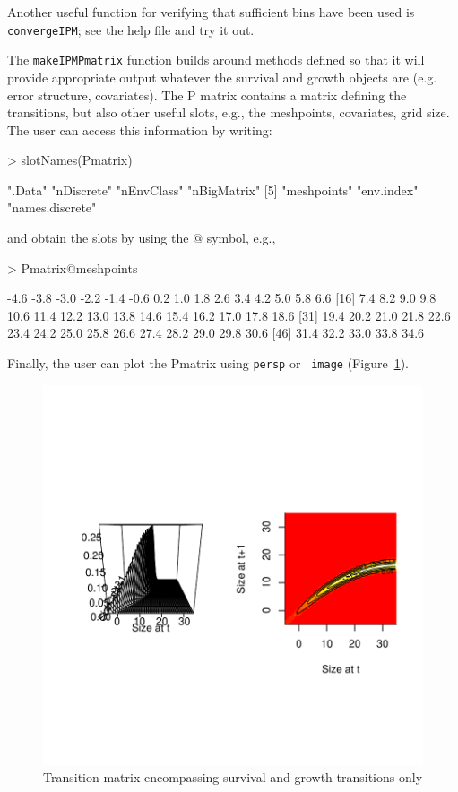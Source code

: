 \documentclass{article}
\begin{document}
Another useful function for verifying that sufficient bins have been used
is {\tt convergeIPM}; see the help file and try it out.

The {\tt makeIPMPmatrix} function builds around methods defined so that it
will provide appropriate output whatever the survival and growth objects are
(e.g. error structure, covariates). The P matrix contains a matrix defining the
transitions, but also other useful slots, e.g., the meshpoints, covariates,
grid size. The user can access this information by writing:
\begin{Schunk}
\begin{Sinput}
> slotNames(Pmatrix)
\end{Sinput}
\begin{Soutput}
[1] ".Data"          "nDiscrete"      "nEnvClass"      "nBigMatrix"    
[5] "meshpoints"     "env.index"      "names.discrete"
\end{Soutput}
\end{Schunk}
and obtain the slots by using the $@$ symbol, e.g., 
\begin{Schunk}
\begin{Sinput}
> Pmatrix@meshpoints
\end{Sinput}
\begin{Soutput}
 [1] -4.6 -3.8 -3.0 -2.2 -1.4 -0.6  0.2  1.0  1.8  2.6  3.4  4.2  5.0  5.8  6.6
[16]  7.4  8.2  9.0  9.8 10.6 11.4 12.2 13.0 13.8 14.6 15.4 16.2 17.0 17.8 18.6
[31] 19.4 20.2 21.0 21.8 22.6 23.4 24.2 25.0 25.8 26.6 27.4 28.2 29.0 29.8 30.6
[46] 31.4 32.2 33.0 33.8 34.6
\end{Soutput}
\end{Schunk}
Finally, the user can plot the Pmatrix using {\tt persp} or {\tt
  image} (Figure~\ref{fig:two}). 
\begin{figure}
\begin{center}
\includegraphics{IPMpack_vignette-fig2}
\end{center}
\caption{Transition matrix encompassing survival and growth transitions only}
\label{fig:two}
\end{figure}
\end{document}
